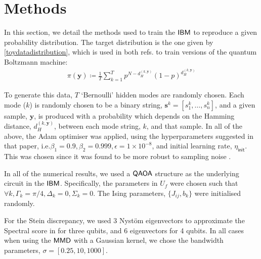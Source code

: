 \section*{Methods}\label{sec:methods}
In this section, we detail the methods used to train the $\textsf{IBM}$ to reproduce a given probability distribution. The target distribution is the one given by \eqref{toydatadistribution}, which is used in both refs.\cite{amin_quantum_2018, verdon_quantum_2017} to train versions of the quantum Boltzmann machine:
\begin{align}
    \pi(\mathbf{y}) \coloneqq \frac{1}{T}\sum\limits_{k=1}^T p^{N - d_H^{(k, \mathbf{y})}}(1-p)^{d_H^{(k, \mathbf{y})}} \label{toydatadistribution}
\end{align}

\noindent To generate this data, $T$ `Bernoulli' hidden modes are randomly chosen. Each mode ($k$) is randomly chosen to be a binary string, $\mathbf{s}^k = [s^k_1, \dots, s^k_n]$, and a given sample, $\mathbf{y}$, is produced with a probability which depends on the Hamming distance, $d_H^{(k, \mathbf{y})}$, between each mode string, $k$, and that sample. In all of the above, the Adam \cite{kingma_adam:_2014} optimiser was applied, using the hyperparameters suggested in that paper, i.e.\@ $\beta_1 = 0.9, \beta_2 = 0.999, \epsilon = 1\times 10^{-8}$, and initial learning rate, $\eta_{\mathsf{init}}$. This was chosen since it was found to be more robust to sampling noise \cite{liu_differentiable_2018}.

In all of the numerical results, we used a $\operatorname{\textsf{QAOA}}$ structure as the underlying circuit in the $\textsf{IBM}$. Specifically, the parameters in $U_f$ were chosen such that $\forall k, \Gamma_k = \pi/4, \Delta_k = 0, \Sigma_k = 0$. The Ising parameters, $\{J_{ij}, b_k\}$ were initialised randomly. 

For the Stein discrepancy, we used 3 Nyst\"{o}m eigenvectors to approximate the Spectral score in  for three qubits, and 6 eigenvectors for 4 qubits. In all cases when using the $\operatorname{\textsf{MMD}}$ with a Gaussian kernel, we chose the bandwidth parameters, $\sigma = [0.25, 10, 1000]$\cite{liu_differentiable_2018}.

